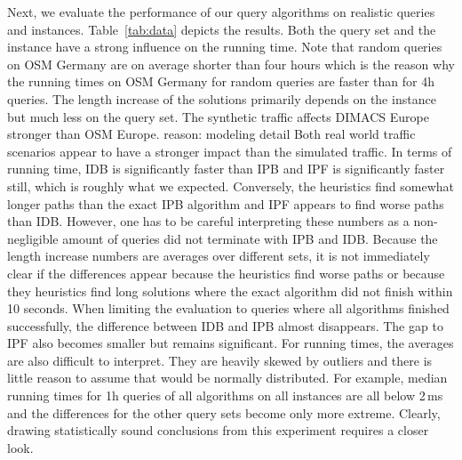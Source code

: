 \documentclass[a4paper,UKenglish,cleveref, autoref, thm-restate]{lipics-v2021}
\begin{document}
Next, we evaluate the performance of our query algorithms on realistic queries and instances.
Table~\ref{tab:data} depicts the results.
Both the query set and the instance have a strong influence on the running time.
Note that random queries on OSM Germany are on average shorter than four hours which is the reason why the running times on OSM Germany for random queries are faster than for 4h queries.
The length increase of the solutions primarily depends on the instance but much less on the query set.
The synthetic traffic affects DIMACS Europe stronger than OSM Europe.
reason: modeling detail
Both real world traffic scenarios appear to have a stronger impact than the simulated traffic.
In terms of running time, IDB is significantly faster than IPB and IPF is significantly faster still, which is roughly what we expected.
Conversely, the heuristics find somewhat longer paths than the exact IPB algorithm and IPF appears to find worse paths than IDB.
However, one has to be careful interpreting these numbers as a non-negligible amount of queries did not terminate with IPB and IDB.
Because the length increase numbers are averages over different sets, it is not immediately clear if the differences appear because the heuristics find worse paths or because they heuristics find long solutions where the exact algorithm did not finish within 10 seconds.
When limiting the evaluation to queries where all algorithms finished successfully, the difference between IDB and IPB almost disappears.
The gap to IPF also becomes smaller but remains significant.
For running times, the averages are also difficult to interpret.
They are heavily skewed by outliers and there is little reason to assume that would be normally distributed.
For example, median running times for 1h queries of all algorithms on all instances are all below 2\,ms and the differences for the other query sets become only more extreme.
Clearly, drawing statistically sound conclusions from this experiment requires a closer look.
\end{document}
